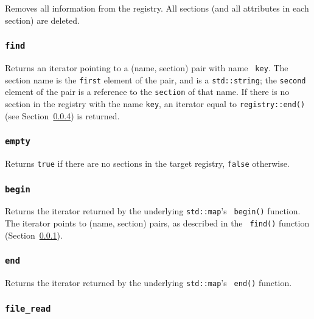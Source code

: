 
Removes all information from the registry.  All sections (and all
attributes in each section) are deleted.


\subsubsection[find]{{\tt find}}
\label{code:reg:find}


Returns an iterator pointing to a (name, section) pair with name {\tt
  key}.
%
The section name is the {\tt first} element of the pair, and is a
{\tt std::string}; the {\tt second} element of the pair is a reference
to the {\tt section} of that name.
%
If there is no section in the registry with the name {\tt key}, an
iterator equal to {\tt registry::end()} (see
Section~\ref{code:reg:end}) is returned.


\subsubsection[empty]{{\tt empty}}


Returns {\tt true} if there are no sections in the target registry,
{\tt false} otherwise.


\subsubsection[begin]{{\tt begin}}


Returns the iterator returned by the underlying {\tt std::map}'s {\tt
begin()} function.  
%
The iterator points to (name, section) pairs, as described in the {\tt
  find()} function (Section~\ref{code:reg:find}).


\subsubsection[end]{{\tt end}}
\label{code:reg:end}


Returns the iterator returned by the underlying {\tt std::map}'s {\tt
end()} function.


\subsubsection[file\_read]{{\tt file\_read}}

